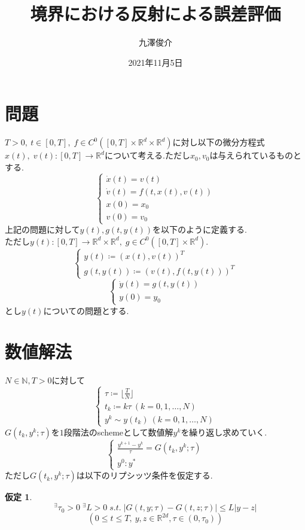 \documentclass[a4,12pt]{article}
\title{境界における反射による誤差評価}
\author{九澤俊介}
\date{2021年11月5日}
\newtheorem{hyp}{仮定}
\begin{document}
\maketitle
\section{問題}
$T>0,\ t\in[0,T],\;f \in C^{0} ([0,T] \times \mathbb{R}^d \times \mathbb{R}^d )$に対し以下の微分方程式$x(t),\; v(t):[0,T]\rightarrow\mathbb{R}^d$について考える.ただし$x_0,v_0$は与えられているものとする.
\begin{equation}
\begin{cases}
\dot{x}(t)=v(t)\\
\dot{v}(t)=f(t,x(t),v(t))\\
x(0)=x_0\\
v(0)=v_0
\end{cases}
\end{equation}
上記の問題に対して$y(t),g(t,y(t))$を以下のように定義する.\\ただし$y(t):[0,T]\rightarrow\mathbb{R}^d\times\mathbb{R}^d,\;g\in C^0([0,T]\times\mathbb{R}^d)$.
\begin{equation}
\begin{cases}
y(t)\coloneqq (x(t),v(t))^T\\
g(t,y(t))\coloneqq (v(t),f(t,y(t)))^T
\end{cases}
\end{equation}
\begin{equation}
\begin{cases}
\dot{y}(t)=g(t,y(t))\\
y(0)=y_0
\end{cases}
\end{equation}
とし$y(t)$についての問題とする.
\section{数値解法}
$N\in\mathbb{N},T>0$に対して
\begin{equation}
\begin{cases}
\tau\coloneqq \lfloor\frac{T}{N}\rfloor \\
t_k\coloneqq k\tau\ (k=0,1,\ldots ,N)\\
y^k\sim y(t_k) \ (k=0,1,\ldots ,N)
\end{cases}
\end{equation}
$G(t_k,y^k;\tau)$を$1$段階法のschemeとして数値解$y^k$を繰り返し求めていく.
\begin{equation}
\begin{cases}\displaystyle\frac{y^{k+1}-y^k}{\tau}=G(t_k,y^k;\tau)\\
y^0:y^*
\end{cases}
\end{equation}
ただし$G(t_k,y^k;\tau)$は以下のリプシッツ条件を仮定する.
\begin{hyp}
\label{lip}
\[{}^\exists\tau_0 > 0\; {}^\exists L>0\; s.t.\; |G(t,y;\tau)-G(t,z;\tau)|\leq L|y-z|\]
\[(0\leq t\leq T,\  y,z\in\mathbb{R}^{2d},\tau\in(0,\tau_0))\]
\end{hyp}
\end{document}
